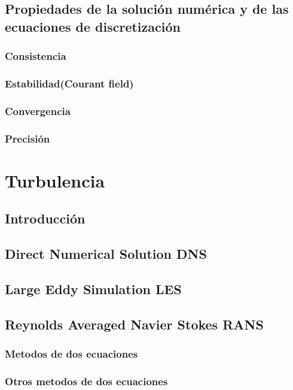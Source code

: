	\subsection{Propiedades de la solución numérica y de las ecuaciones de discretización}
		\subsubsection{Consistencia}
		\subsubsection{Estabilidad(Courant field)}
		\subsubsection{Convergencia}
		\subsubsection{Precisión}
		
\section{Turbulencia}
	\subsection{Introducción}%
	\subsection{Direct Numerical  Solution DNS}
	\subsection{Large Eddy Simulation LES}
	\subsection{Reynolds Averaged Navier Stokes RANS}
		\subsubsection{Metodos de dos ecuaciones}
		\subsubsection{Otros metodos de dos ecuaciones}
	
	